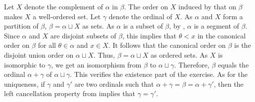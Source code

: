 \documentclass{article}
\begin{document}
\begin{solution}
  \label{sol:uehkw7vd}
  Let \(X\) denote the complement of \(\alpha\) in \(\beta\).  The
  order on \(X\) induced by that on \(\beta\) makes \(X\) a
  well-ordered set.  Let \(\gamma\) denote the ordinal of \(X\).  As
  \(\alpha\) and \(X\) form a partition of \(\beta\),
  \(\beta = \alpha \sqcup X\) as sets.  As \(\alpha\) is a subset of
  \(\beta\), by , \(\alpha\) is a
  segment of \(\beta\).  Since \(\alpha\) and \(X\) are disjoint
  subsets of \(\beta\), this implies that \(\theta < x\) in the
  canonical order on \(\beta\) for all \(\theta \in \alpha\) and
  \(x \in X\).  It follows that the canonical order on \(\beta\) is
  the disjoint union order on \(\alpha \sqcup X\).  Thus,
  \(\beta = \alpha \sqcup X\) as ordered sets.  As \(X\) is isomorphic
  to \(\gamma\), we get an isomorphism from \(\beta\) to
  \(\alpha \sqcup \gamma\).  Therefore, \(\beta\) equals the ordinal
  \(\alpha + \gamma\) of \(\alpha \sqcup \gamma\).  This verifies the
  existence part of the exercise.  As for the uniqueness, if
  \(\gamma\) and \(\gamma'\) are two ordinals such that
  \(\alpha + \gamma = \beta = \alpha + \gamma'\), then the left
  cancellation property from  implies that
  \(\gamma = \gamma'\).
\end{solution}
\end{document}

